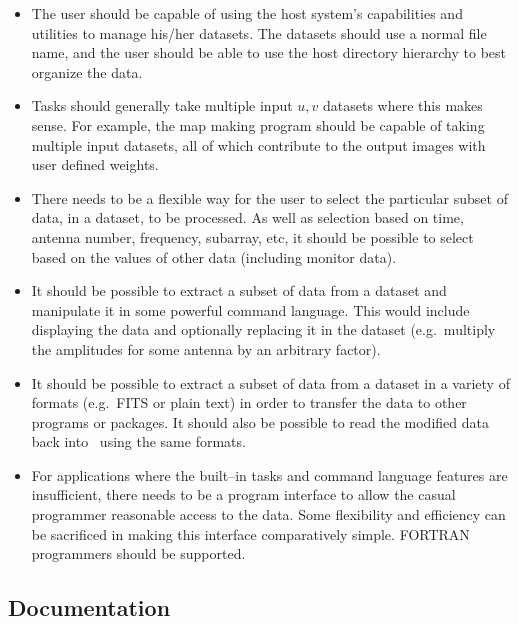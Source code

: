 \begin{itemize}
  
\item The user should be capable of using the host system's
  capabilities and utilities to manage his\slash her datasets. The datasets
  should use a normal file name, and the user should be able to use
  the host directory hierarchy to best organize the data.

\item Tasks should generally take multiple input $u,\! v$ datasets where
  this makes sense. For example, the map making program should be
  capable of taking multiple input datasets, all of which contribute
  to the output images with user defined weights.
  
\item There needs to be a flexible way for the user to select the
  particular subset of data, in a dataset, to be processed. As well as
  selection based on time, antenna number, frequency, subarray, etc,
  it should be possible to select based on the values of other data
  (including monitor data).

\item It should be possible to extract a subset of data from a dataset
  and manipulate it in some powerful command language. This would
  include displaying the data and optionally replacing it in the
  dataset (e.g.\ multiply the amplitudes for some antenna by an
  arbitrary factor).

\item It should be possible to extract a subset of data from a dataset
  in a variety of formats (e.g.\ FITS or plain text) in order to
  transfer the data to other programs or packages. It should also be
  possible to read the modified data back into \aipspp\ using the same
  formats.

\item For applications where the built--in tasks and command language
  features are insufficient, there needs to be a program interface to
  allow the casual programmer reasonable access to the data. Some
  flexibility and efficiency can be sacrificed in making this
  interface comparatively simple.  FORTRAN programmers should be
  supported.

\end{itemize}


\subsection{Documentation}

